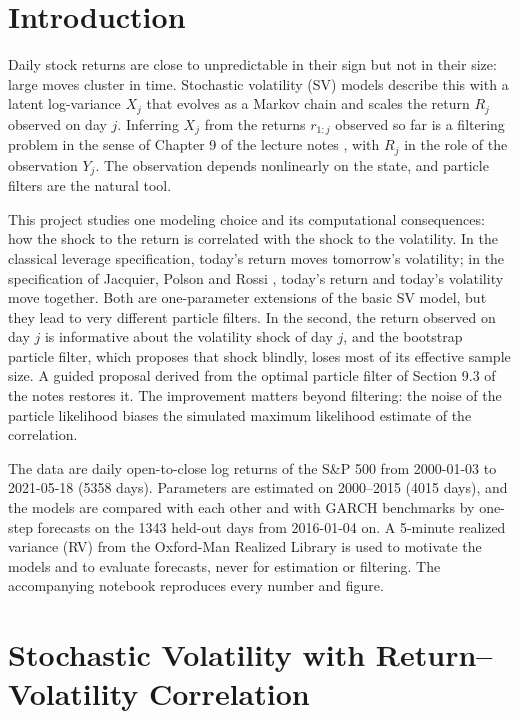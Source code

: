 \section{Introduction}

Daily stock returns are close to unpredictable in their sign but not in their size: large moves cluster in time. Stochastic volatility (SV) models describe this with a latent log-variance $X_j$ that evolves as a Markov chain and scales the return $R_j$ observed on day $j$. Inferring $X_j$ from the returns $r_{1:j}$ observed so far is a filtering problem in the sense of Chapter 9 of the lecture notes \cite{sanzAlonsoAlGhattas}, with $R_j$ in the role of the observation $Y_j$. The observation depends nonlinearly on the state, and particle filters are the natural tool.

This project studies one modeling choice and its computational consequences: how the shock to the return is correlated with the shock to the volatility. In the classical leverage specification, today's return moves tomorrow's volatility; in the specification of Jacquier, Polson and Rossi \cite{jacquierPolsonRossi2004}, today's return and today's volatility move together. Both are one-parameter extensions of the basic SV model, but they lead to very different particle filters. In the second, the return observed on day $j$ is informative about the volatility shock of day $j$, and the bootstrap particle filter, which proposes that shock blindly, loses most of its effective sample size. A guided proposal derived from the optimal particle filter of Section 9.3 of the notes restores it. The improvement matters beyond filtering: the noise of the particle likelihood biases the simulated maximum likelihood estimate of the correlation.

The data are daily open-to-close log returns of the S\&P 500 from 2000-01-03 to 2021-05-18 (5358 days). Parameters are estimated on 2000--2015 (4015 days), and the models are compared with each other and with GARCH benchmarks by one-step forecasts on the 1343 held-out days from 2016-01-04 on. A 5-minute realized variance (RV) from the Oxford-Man Realized Library \cite{heberEtAl2009} is used to motivate the models and to evaluate forecasts, never for estimation or filtering. The accompanying notebook reproduces every number and figure.

\section{Stochastic Volatility with Return--Volatility Correlation}

